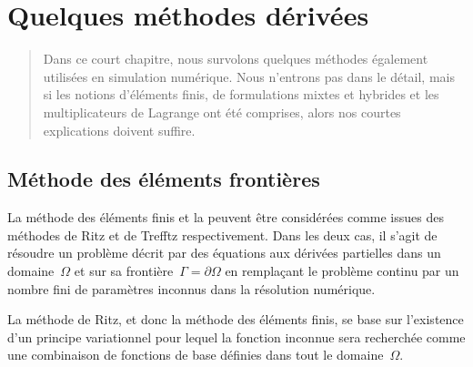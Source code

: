 \chapter{Quelques méthodes dérivées}\label{Ch-XFEM}
\begin{abstract} Dans ce court chapitre, nous survolons quelques méthodes également utilisées en simulation numérique. Nous n'entrons pas dans le détail, mais si les notions d'éléments finis, de formulations mixtes et hybrides et les multiplicateurs de Lagrange ont été comprises, alors nos courtes explications doivent suffire.
\end{abstract} %


\medskip
\section{Méthode des éléments frontières}\label{Sec-BEM}
La méthode des éléments finis et la  peuvent être considérées comme issues des méthodes de Ritz et de Trefftz respectivement. Dans les deux cas, il s'agit de résoudre un problème décrit par des équations aux dérivées partielles dans un domaine~$\Omega$ et sur sa frontière~$\Gamma=\partial\Omega$ en remplaçant le problème continu par un nombre fini de paramètres inconnus dans la résolution numérique.

\medskip
La méthode de Ritz, et donc la méthode des éléments finis, se base sur l'existence d'un principe variationnel pour lequel la fonction inconnue sera recherchée comme une combinaison de fonctions de base définies dans tout le domaine~$\Omega$.

